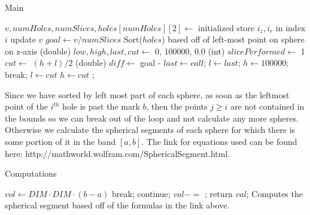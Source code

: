 \documentclass[12pt]{article}
\begin{document}
\begin{algorithm}[H]
\caption{Main}
\begin{algorithmic}
        \State $v, numHoles, numSlices, holes[numHoles][2] \gets$ initialized
            \State store $i_z, i_r$ in index $i$
            \State update $v$
        \EndFor
        \State $goal \gets v/numSlices$
        \State Sort($holes$) based off of left-most point on sphere on z-axis
        \State {}
    \EndProcedure
        \State (double) $low, high, last, cut \gets$ 0, 100000, 0.0
        \State (int) $slicePerformed \gets$ 1
            \State $cut \gets$ $(h + l)/2$
            \State (double) $diff \gets$ goal - 
                \State {}
                \State $last \gets call$; $l \gets last$; $h \gets 100000$;
                    break;
                \EndIf
                $l \gets cut$
            \Else
                $h \gets cut$
            \EndIf
        \EndWhile
        \State {};
    \EndProcedure
\end{algorithmic}
\end{algorithm}

Since we have sorted by left most part of each sphere, as soon as the leftmost point of the $i^{th}$
hole is past the mark $b$, then the points $j \geq i$ are not contained in the bounds so we can break
out of the loop and not calculate any more spheres. Otherwise we calculate the spherical segments of
each sphere for which there is some portion of it in the band $[a,b]$. The link for equations used
can be found here: http://mathworld.wolfram.com/SphericalSegment.html.

\begin{algorithm}[H]
\caption{Computations}
\begin{algorithmic}
        \State $vol \gets DIM\cdot DIM\cdot (b-a)$
                break;
            \EndIf
                continue;
            \EndIf
            \State $val -=$ ;
        \EndFor
        \State return $val$;
    \EndProcedure
        \State Computes the spherical segment based off of the formulas in the link above.
    \EndProcedure
\end{algorithmic}
\end{algorithm}
\end{document}
